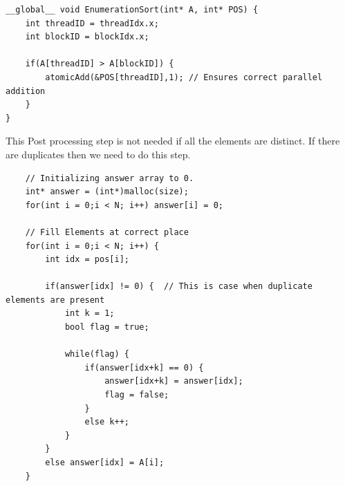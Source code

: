 \documentclass{article}
\begin{document}

\begin{lstlisting}
__global__ void EnumerationSort(int* A, int* POS) {
    int threadID = threadIdx.x;
    int blockID = blockIdx.x;

    if(A[threadID] > A[blockID]) {
        atomicAdd(&POS[threadID],1); // Ensures correct parallel addition
    }
}
\end{lstlisting}

This Post processing step is not needed if all the elements are distinct. If there are duplicates then we need to do this step.

\begin{lstlisting}
    // Initializing answer array to 0.
    int* answer = (int*)malloc(size);
    for(int i = 0;i < N; i++) answer[i] = 0;

    // Fill Elements at correct place
    for(int i = 0;i < N; i++) {
        int idx = pos[i];

        if(answer[idx] != 0) {  // This is case when duplicate elements are present
            int k = 1;
            bool flag = true;

            while(flag) {
                if(answer[idx+k] == 0) {
                    answer[idx+k] = answer[idx];
                    flag = false;
                }
                else k++;
            }
        }
        else answer[idx] = A[i];
    }
\end{lstlisting}
\end{document}
